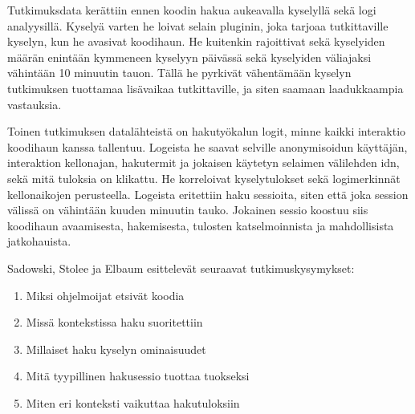\documentclass[finnish]{../tktltiki2}
\theoremstyle{definition}
\theoremstyle{remark}
\begin{document}
Tutkimuksdata kerättiin ennen koodin hakua aukeavalla kyselyllä sekä logi analyysillä.
Kyselyä varten he loivat selain pluginin, joka tarjoaa tutkittaville kyselyn, kun he avasivat koodihaun. He kuitenkin rajoittivat sekä kyselyiden määrän enintään kymmeneen kyselyyn päivässä sekä kyselyiden väliajaksi vähintään 10 minuutin tauon. Tällä he pyrkivät vähentämään kyselyn tutkimuksen tuottamaa lisävaikaa tutkittaville, ja siten saamaan laadukkaampia vastauksia.

Toinen tutkimuksen datalähteistä on hakutyökalun logit, minne kaikki interaktio koodihaun kanssa tallentuu. Logeista he saavat selville anonymisoidun käyttäjän, interaktion kellonajan, hakutermit ja jokaisen käytetyn selaimen välilehden idn, sekä mitä tuloksia on klikattu. He korreloivat kyselytulokset sekä logimerkinnät kellonaikojen perusteella. Logeista eritettiin haku sessioita, siten että joka session välissä on vähintään kuuden minuutin tauko. Jokainen sessio koostuu siis koodihaun avaamisesta, hakemisesta, tulosten katselmoinnista ja mahdollisista jatkohauista. %






Sadowski, Stolee ja Elbaum esittelevät seuraavat tutkimuskysymykset:

\begin{enumerate}

  \item Miksi ohjelmoijat etsivät koodia %

  \item Missä kontekstissa haku suoritettiin %

  \item Millaiset haku kyselyn ominaisuudet %

  \item Mitä tyypillinen hakusessio tuottaa tuokseksi

  \item Miten eri konteksti vaikuttaa hakutuloksiin

\end{enumerate}
\end{document}
